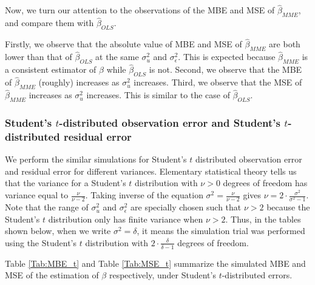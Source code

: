 \documentclass{article}
\begin{document}
Now, we turn our attention to the observations of the MBE and MSE of $\hat{\beta}_{MME}$, and compare them with $\hat{\beta}_{OLS}$.

Firstly, we observe that the absolute value of MBE and MSE of $\hat{\beta}_{MME}$ are both lower than that of $\hat{\beta}_{OLS}$ at the same $\sigma^2_u$ and $\sigma^2_\epsilon$.
This is expected because $\hat{\beta}_{MME}$ is a consistent estimator of $\beta$ while $\hat{\beta}_{OLS}$ is not.
Second, we observe that the MBE of $\hat{\beta}_{MME}$ (roughly) increases as $\sigma^2_u$ increases.
Third, we observe that the MSE of $\hat{\beta}_{MME}$ increases as $\sigma^2_u$ increases. This is similar to the case of $\hat{\beta}_{OLS}$.

\subsubsection{Student's $t$-distributed observation error and Student's $t$-distributed residual error}

We perform the similar simulations for Student's $t$ distributed observation error and residual error for different variances.
Elementary statistical theory tells us that the variance for a Student's $t$ distribution with $\nu > 0$ degrees of freedom has variance equal to $\frac{\nu}{\nu-2}$.
Taking inverse of the equation $\sigma^2 = \frac{\nu}{\nu-2}$ gives $\nu = 2 \cdot \frac{\sigma^2}{\sigma^2-1}$.
Note that the range of $\sigma^2_u$ and $\sigma^2_\epsilon$ are specially chosen such that $\nu > 2$ because the Student's $t$ distribution only has finite variance when $\nu > 2$.
Thus, in the tables shown below, when we write $\sigma^2 = \delta$, it means the simulation trial was performed using the Student's $t$ distribution with $2 \cdot \frac{\delta}{\delta-1}$ degrees of freedom.

Table \ref{Tab:MBE_t} and Table \ref{Tab:MSE_t} summarize the simulated MBE and MSE of the estimation of $\beta$ respectively, under Student's $t$-distributed errors.
\end{document}
